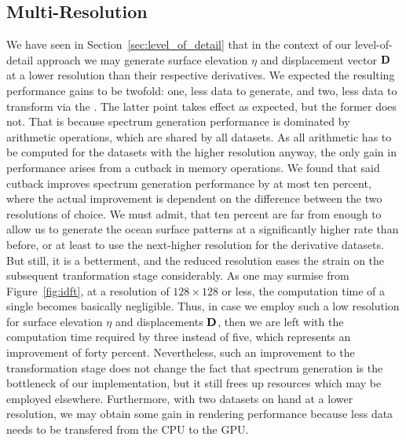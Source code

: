 

%
%
\subsection{Multi-Resolution}
We have seen in Section~\ref{sec:level_of_detail} that in the context of our
level-of-detail approach we may generate surface elevation $\eta$ and
displacement vector $\mathbf{D}$ at a lower resolution than their respective
derivatives. We expected the resulting performance gains to be twofold: one,
less data to generate, and two, less data to transform via the \IDFT.
The latter point takes effect as expected, but the former does not.
That is because spectrum generation performance is
dominated by arithmetic operations, which are shared by all datasets. As all
arithmetic has to be computed for the datasets with the higher resolution
anyway, the only gain in performance arises from a cutback in memory operations.
We found that said cutback improves spectrum generation performance by at most
ten percent, where the actual improvement is dependent on the difference between
the two resolutions of choice. We must admit, that ten percent are far from
enough to allow us to generate the ocean surface patterns at a significantly
higher rate than before, or at least to use the next-higher resolution for the
derivative datasets. But still, it is a betterment, and the reduced resolution
eases the strain on the subsequent tranformation stage considerably.
As one may surmise from Figure~\ref{fig:idft}, at a resolution of $128\times128$
or less, the computation time of a single \IDFT becomes basically negligible.
Thus, in case we employ such a low resolution for surface elevation $\eta$ and
displacements $\mathbf{D}$, then we are left with the computation time required
by three \IDFTs instead of five, which represents an improvement of forty percent.
Nevertheless, such an improvement to the transformation stage does not change
the fact that spectrum generation is the bottleneck of our implementation, but
it still frees up resources which may be employed elsewhere.
Furthermore, with two datasets on hand at a lower resolution, we may obtain some
gain in rendering performance because less data needs to be transfered from the
CPU to the GPU.

